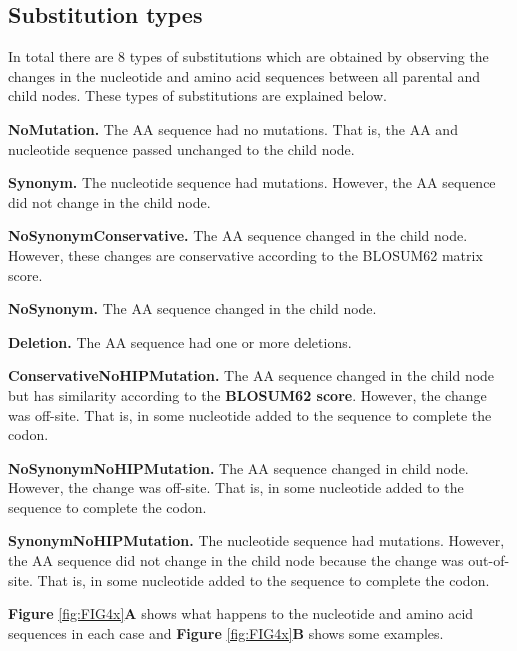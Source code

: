 \documentclass[
]{book}
\begin{document}
\hypertarget{substitution-types}{%
\subsection{Substitution types}\label{substitution-types}}

In total there are 8 types of substitutions which are obtained by observing the changes in the nucleotide and amino acid sequences between all parental and child nodes. These types of substitutions are explained below.

\textbf{NoMutation.} The AA sequence had no mutations. That is, the AA and nucleotide sequence passed unchanged to the child node.

\textbf{Synonym.} The nucleotide sequence had mutations. However, the AA sequence did not change in the child node.

\textbf{NoSynonymConservative.} The AA sequence changed in the child node. However, these changes are conservative according to the BLOSUM62 matrix score.

\textbf{NoSynonym.} The AA sequence changed in the child node.

\textbf{Deletion.} The AA sequence had one or more deletions.

\textbf{ConservativeNoHIPMutation.} The AA sequence changed in the child node but has similarity according to the \textbf{BLOSUM62 score}. However, the change was off-site. That is, in some nucleotide added to the sequence to complete the codon.

\textbf{NoSynonymNoHIPMutation.} The AA sequence changed in child node. However, the change was off-site. That is, in some nucleotide added to the sequence to complete the codon.

\textbf{SynonymNoHIPMutation.} The nucleotide sequence had mutations. However, the AA sequence did not change in the child node because the change was out-of-site. That is, in some nucleotide added to the sequence to complete the codon.

\textbf{Figure} \ref{fig:FIG4x}\textbf{A} shows what happens to the nucleotide and amino acid sequences in each case and \textbf{Figure} \ref{fig:FIG4x}\textbf{B} shows some examples.
\end{document}
